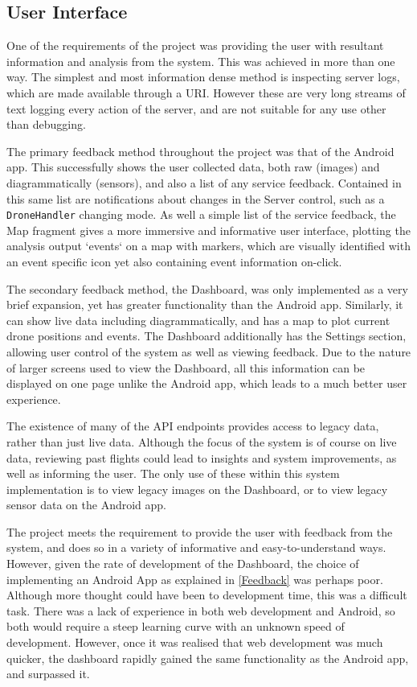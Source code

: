 \documentclass{article}
\begin{document}
\subsection{User Interface}
One of the requirements of the project was providing the user with resultant information and analysis from the system. This was achieved in more than one way. The simplest and most information dense method is inspecting server logs, which are made available through a URI. However these are very long streams of text logging every action of the server, and are not suitable for any use other than debugging. 

The primary feedback method throughout the project was that of the Android app. This successfully shows the user collected data, both raw (images) and diagrammatically (sensors), and also a list of any service feedback. Contained in this same list are notifications about changes in the Server control, such as a \texttt{DroneHandler} changing mode. As well a simple list of the service feedback, the Map fragment gives a more immersive and informative user interface, plotting the analysis output `events` on a map with markers, which are visually identified with an event specific icon yet also containing event information on-click.

The secondary feedback method, the Dashboard, was only implemented as a very brief expansion, yet has greater functionality than the Android app. Similarly, it can show live data including diagrammatically, and has a map to plot current drone positions and events. The Dashboard additionally has the Settings section, allowing user control of the system as well as viewing feedback. Due to the nature of larger screens used to view the Dashboard, all this information can be displayed on one page unlike the Android app, which leads to a much better user experience. 

The existence of many of the API endpoints provides access to legacy data, rather than just live data. Although the focus of the system is of course on live data, reviewing past flights could lead to insights and system improvements, as well as informing the user. The only use of these within this system implementation is to view legacy images on the Dashboard, or to view legacy sensor data on the Android app.  

The project meets the requirement to provide the user with feedback from the system, and does so in a variety of informative and easy-to-understand ways. However, given the rate of development of the Dashboard, the choice of implementing an Android App as explained in \ref{Feedback} was perhaps poor. Although more thought could have been to development time, this was a difficult task. There was a lack of experience in both web development and Android, so both would require a steep learning curve with an unknown speed of development. However, once it was realised that web development was much quicker, the dashboard rapidly gained the same functionality as the Android app, and surpassed it. 
\end{document}
